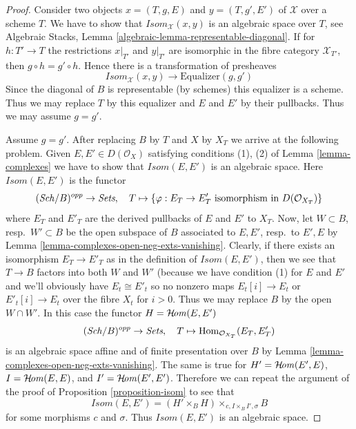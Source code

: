 \begin{proof}
Consider two objects $x = (T, g, E)$ and $y = (T, g', E')$
of $\mathcal{X}$ over a scheme $T$. We have to show that
$\mathit{Isom}_\mathcal{X}(x, y)$ is an algebraic space over $T$, see
Algebraic Stacks, Lemma \ref{algebraic-lemma-representable-diagonal}.
If for $h : T' \to T$ the restrictions $x|_{T'}$ and $y|_{T'}$ are isomorphic
in the fibre category $\mathcal{X}_{T'}$, then $g \circ h = g' \circ h$.
Hence there is a transformation of presheaves
$$
\mathit{Isom}_\mathcal{X}(x, y) \longrightarrow \text{Equalizer}(g, g')
$$
Since the diagonal of $B$ is representable (by schemes) this equalizer is
a scheme. Thus we may replace $T$ by this equalizer and
$E$ and $E'$ by their pullbacks. Thus we may assume $g = g'$.

\medskip\noindent
Assume $g = g'$. After replacing $B$ by $T$ and $X$ by $X_T$ we arrive
at the following problem. Given $E, E' \in D(\mathcal{O}_X)$
satisfying conditions (1), (2) of Lemma \ref{lemma-complexes}
we have to show that $\mathit{Isom}(E, E')$ is an algebraic space.
Here $\mathit{Isom}(E, E')$ is the functor
$$
(\mathit{Sch}/B)^{opp} \to \textit{Sets},\quad
T \mapsto \{\varphi : E_T \to E'_T
\text{ isomorphism in }D(\mathcal{O}_{X_T})\}
$$
where $E_T$ and $E'_T$ are the derived pullbacks of $E$ and $E'$
to $X_T$. Now, let $W \subset B$, resp.\ $W' \subset B$ be the
open subspace of $B$ associated
to $E, E'$, resp.\ to $E', E$ by
Lemma \ref{lemma-complexes-open-neg-exts-vanishing}.
Clearly, if there exists an isomorphism $E_T \to E'_T$ as in
the definition of $\mathit{Isom}(E, E')$, then we see that
$T \to B$ factors into both $W$ and $W'$ (because we have
condition (1) for $E$ and $E'$ and we'll obviously have
$E_t \cong E'_t$ so no nonzero maps $E_t[i] \to E_t$
or $E'_t[i] \to E_t$ over the fibre $X_t$ for $i > 0$.
Thus we may replace $B$ by the open $W \cap W'$.
In this case the functor $H = \mathop{\mathcal{H}\!\mathit{om}}\nolimits(E, E')$
$$
(\mathit{Sch}/B)^{opp} \to \textit{Sets},\quad T \mapsto
\mathop{\mathrm{Hom}}\nolimits_{\mathcal{O}_{X_T}}(E_T, E'_T)
$$
is an algebraic space affine and of finite presentation over $B$ by
Lemma \ref{lemma-complexes-open-neg-exts-vanishing}.
The same is true for
$H' = \mathop{\mathcal{H}\!\mathit{om}}\nolimits(E', E)$,
$I = \mathop{\mathcal{H}\!\mathit{om}}\nolimits(E, E)$, and
$I' = \mathop{\mathcal{H}\!\mathit{om}}\nolimits(E', E')$.
Therefore we can repeat the argument of the proof of
Proposition \ref{proposition-isom} to see that
$$
\mathit{Isom}(E, E') = (H' \times_B H) \times_{c, I \times_B I', \sigma} B
$$
for some morphisms $c$ and $\sigma$. Thus
$\mathit{Isom}(E, E')$ is an algebraic space.
\end{proof}

